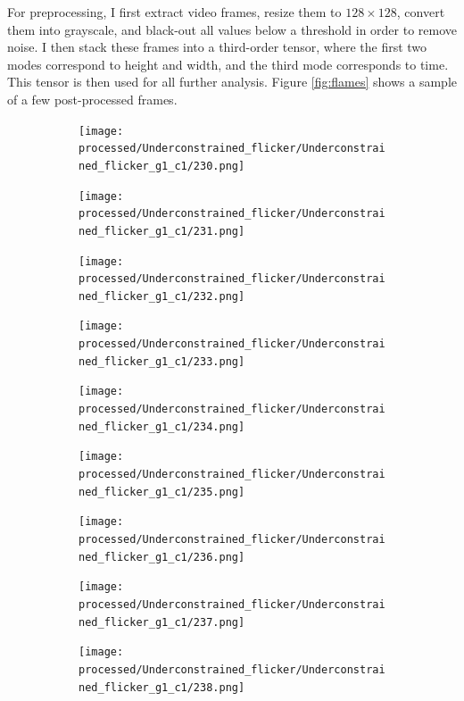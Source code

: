 \documentclass{article}
\begin{document}
For preprocessing, I first extract video frames, resize them to $128\times 128$, convert them into grayscale, and black-out all values below a threshold in order to remove noise. I then stack these frames into a third-order tensor, where the first two modes correspond to height and width, and the third mode corresponds to time. This tensor is then used for all further analysis. Figure \ref{fig:flames} shows a sample of a few post-processed frames.

\begin{figure}
	\centering
	\begin{subfigure}{0.1\textwidth}
		\texttt{[image: processed/Underconstrained\_flicker/Underconstrained\_flicker\_g1\_c1/230.png]}
	\end{subfigure}
	\begin{subfigure}{0.1\textwidth}
		\texttt{[image: processed/Underconstrained\_flicker/Underconstrained\_flicker\_g1\_c1/231.png]}
	\end{subfigure}
	\begin{subfigure}{0.1\textwidth}
		\texttt{[image: processed/Underconstrained\_flicker/Underconstrained\_flicker\_g1\_c1/232.png]}
	\end{subfigure}
	\begin{subfigure}{0.1\textwidth}
		\texttt{[image: processed/Underconstrained\_flicker/Underconstrained\_flicker\_g1\_c1/233.png]}
	\end{subfigure}
	\begin{subfigure}{0.1\textwidth}
		\texttt{[image: processed/Underconstrained\_flicker/Underconstrained\_flicker\_g1\_c1/234.png]}
	\end{subfigure}
	\begin{subfigure}{0.1\textwidth}
		\texttt{[image: processed/Underconstrained\_flicker/Underconstrained\_flicker\_g1\_c1/235.png]}
	\end{subfigure}
	\begin{subfigure}{0.1\textwidth}
		\texttt{[image: processed/Underconstrained\_flicker/Underconstrained\_flicker\_g1\_c1/236.png]}
	\end{subfigure}
	\begin{subfigure}{0.1\textwidth}
		\texttt{[image: processed/Underconstrained\_flicker/Underconstrained\_flicker\_g1\_c1/237.png]}
	\end{subfigure}
	\begin{subfigure}{0.1\textwidth}
		\texttt{[image: processed/Underconstrained\_flicker/Underconstrained\_flicker\_g1\_c1/238.png]}
	\end{subfigure}

\end{figure}
\end{document}
